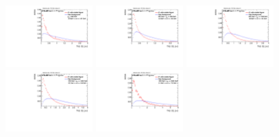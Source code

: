 \begin{figure}[H]
\bigskip
\includegraphics[width=0.3\textwidth]{sascha_input/Appendix/Distributions/higgs/distributions/beta2/h_assisted_tj_D2_2_bin1.pdf} \hspace{1mm}
\includegraphics[width=0.3\textwidth]{sascha_input/Appendix/Distributions/higgs/distributions/beta2/h_assisted_tj_D2_2_bin2.pdf} \hspace{4mm}
\includegraphics[width=0.3\textwidth]{sascha_input/Appendix/Distributions/higgs/distributions/beta2/h_assisted_tj_D2_2_bin3.pdf} 
\bigskip
\includegraphics[width=0.3\textwidth]{sascha_input/Appendix/Distributions/higgs/distributions/beta2/h_assisted_tj_D2_2_bin4.pdf} \hspace{4mm}
\includegraphics[width=0.3\textwidth]{sascha_input/Appendix/Distributions/higgs/distributions/beta2/h_assisted_tj_D2_2_bin5.pdf} 


\end{figure}
